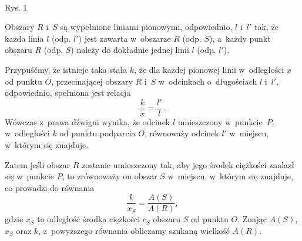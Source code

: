 {
\\[4pt]
{Rys. 1} %
}%
\hspace*{1.5cm}
\begin{minipage}{11cm}\raggedright
Obszary $R$ i~$S$ są wypełnione liniami pionowymi, odpowiednio, $l$ i~$l'$ tak, że każda linia $l$ (odp. $l'$) jest zawarta w~obszarze $R$ (odp. $S$), a~każdy punkt obszaru $R$ (odp. $S$) należy do dokładnie jednej linii $l$ (odp. $l'$).

Przypuśćmy, że istnieje taka stała $k$, że dla każdej pionowej linii w~odległości $x$ od punktu $O$, przecinającej obszary $R$ i~$S$ w~odcinkach o~długościach $l$ i~$l',$ odpowiednio, spełniona jest relacja
\begin{equation*}
\frac{k}{x}=\frac{l'}{l}\,.
\end{equation*}
Wówczas z~prawa dźwigni wynika, że odcinek $l$ umieszczony w~punkcie~$P$,
w~odległości $k$ od punktu podparcia $O$, równoważy odcinek $l'$ w~miejscu,
w~którym się znajduje. 
\end{minipage}\goodbreak

Zatem jeśli obszar $R$ zostanie umieszczony tak, aby
jego środek ciężkości znalazł się w~punkcie $P$, to zrównoważy on obszar $S$
w~miejscu, w~którym się znajduje, co prowadzi do równania 
\begin{equation*} 
\frac{k}{x_S}=\frac{A(S)}{A(R)}, 
\end{equation*}
gdzie $x_S$ to odległość środka ciężkości $c_S$ obszaru $S$ od punktu $O$. Znając $A(S)$, $x_S$ oraz $k$, z~powyższego równania obliczamy szukaną wielkość $A(R)$.

